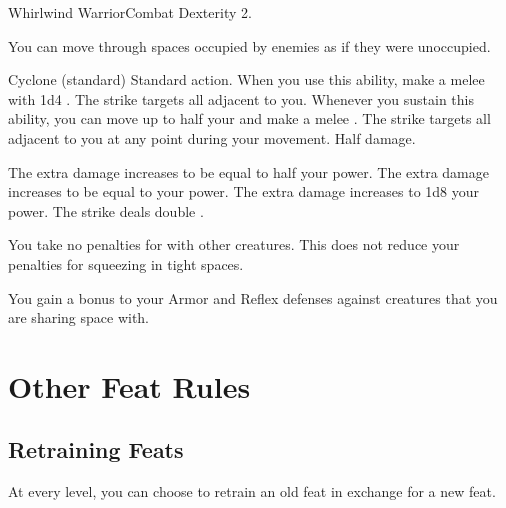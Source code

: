   \begin{feat}{Whirlwind Warrior}{Combat}
    \featpre Dexterity 2.

     You can move through spaces occupied by enemies as if they were unoccupied.

    \begin{sustainability}{Cyclone}{ (standard)}
      \abilityusagetime Standard action.
      \rankline
      When you use this ability, make a melee  with 1d4 .
      The strike targets all  adjacent to you.
      Whenever you sustain this ability, you can move up to half your  and make a melee .
      The strike targets all  adjacent to you at any point during your movement.
      \miss Half damage.

      \rankline
       The extra damage increases to be equal to half your power.
       The extra damage increases to be equal to your power.
       The extra damage increases to 1d8 \add your power.
       The strike deals double .
    \end{sustainability}

     You take no penalties for \squeezing with other creatures.
    This does not reduce your penalties for squeezing in tight spaces.

     You gain a  bonus to your Armor and Reflex defenses against creatures that you are sharing space with.
  \end{feat}

\section{Other Feat Rules}

  \subsection{Retraining Feats}
    At every level, you can choose to retrain an old feat in exchange for a new feat.
